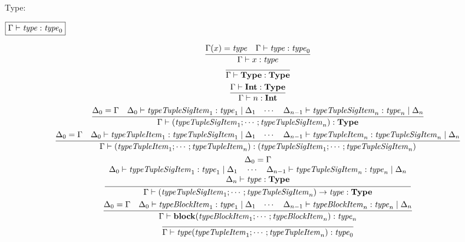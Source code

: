 Type:

$\fbox{$\Gamma \vdash \mathit{type}: \mathit{type}_0$}$

\begin{gather*}
  \infer{\Gamma \vdash x: \mathit{type}}{
    \Gamma(x) = \mathit{type}
    &
    \Gamma \vdash \mathit{type}: \mathit{type}_0
  }
  \\
  \infer{\Gamma \vdash \mathbf{Type}: \mathbf{Type}}{}
  \\
  \infer{\Gamma \vdash n: \mathbf{Int}}{
    \Gamma \vdash \mathbf{Int}: \mathbf{Type}
  }
  \\
  \infer{\Gamma \vdash (\mathit{typeTupleSigItem}_1; \cdots; \mathit{typeTupleSigItem}_n): \mathbf{Type}}{
    \Delta_0 = \Gamma
    &
    \Delta_0 \vdash \mathit{typeTupleSigItem}_1: \mathit{type}_1 \mid \Delta_1
    &
    \cdots
    &
    \Delta_{n - 1} \vdash \mathit{typeTupleSigItem}_n: \mathit{type}_n \mid \Delta_n
  }
  \\
  \infer{\Gamma \vdash (\mathit{typeTupleItem}_1; \cdots; \mathit{typeTupleItem}_n): (\mathit{typeTupleSigItem}_1; \cdots; \mathit{typeTupleSigItem}_n)}{
    \Delta_0 = \Gamma
    &
    \Delta_0 \vdash \mathit{typeTupleItem}_1: \mathit{typeTupleSigItem}_1 \mid \Delta_1
    &
    \cdots
    &
    \Delta_{n - 1} \vdash \mathit{typeTupleItem}_n: \mathit{typeTupleSigItem}_n \mid \Delta_n
  }
  \\
  \infer{\Gamma \vdash (\mathit{typeTupleSigItem}_1; \cdots; \mathit{typeTupleSigItem}_n) \rightarrow \mathit{type}: \mathbf{Type}}{
    \begin{array}{c}
      \Delta_0 = \Gamma
      \\
      \Delta_0 \vdash \mathit{typeTupleSigItem}_1: \mathit{type}_1 \mid \Delta_1
      \hspace{1em}
      \cdots
      \hspace{1em}
      \Delta_{n - 1} \vdash \mathit{typeTupleSigItem}_n: \mathit{type}_n \mid \Delta_n
      \\
      \Delta_n \vdash \mathit{type}: \mathbf{Type}
    \end{array}
  }
  \\
  \infer{\Gamma \vdash \mathbf{block}(\mathit{typeBlockItem}_1; \cdots; \mathit{typeBlockItem}_n): \mathit{type}_n}{
    \Delta_0 = \Gamma
    &
    \Delta_0 \vdash \mathit{typeBlockItem}_1: \mathit{type}_1 \mid \Delta_1
    &
    \cdots
    &
    \Delta_{n - 1} \vdash \mathit{typeBlockItem}_n: \mathit{type}_n \mid \Delta_n
  }
  \\
  \infer{\Gamma \vdash \mathit{type}(\mathit{typeTupleItem}_1; \cdots; \mathit{typeTupleItem}_n): \mathit{type}_0}{
}
\end{gather*}
